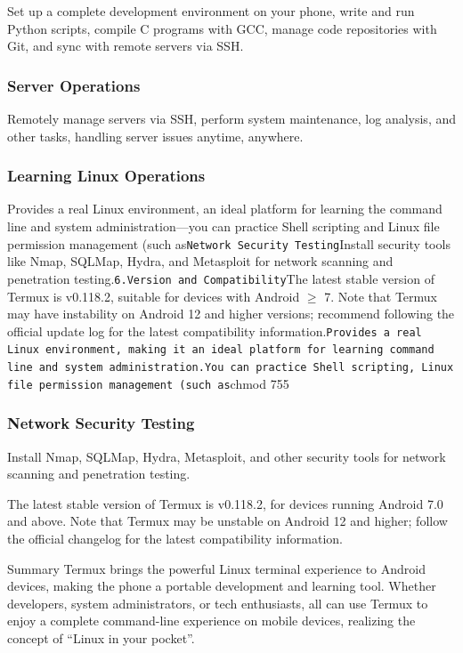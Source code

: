 Set up a complete development environment on your phone, write and run Python scripts, compile C programs with GCC, manage code repositories with Git, and sync with remote servers via SSH.

\subsubsection*{Server Operations}

Remotely manage servers via SSH, perform system maintenance, log analysis, and other tasks, handling server issues anytime, anywhere.

\subsubsection*{Learning Linux Operations}

Provides a real Linux environment, an ideal platform for learning the command line and system administration—you can practice Shell scripting and Linux file permission management (such as\texttt{Network Security Testing}Install security tools like Nmap, SQLMap, Hydra, and Metasploit for network scanning and penetration testing.\texttt{6.\allowbreak  Version and Compatibility}The latest stable version of Termux is v0.118.2, suitable for devices with Android $\geq$ 7. Note that Termux may have instability on Android 12 and higher versions; recommend following the official update log for the latest compatibility information.\texttt{Provides a real Linux environment, making it an ideal platform for learning command line and system administration.\allowbreak  You can practice Shell scripting, Linux file permission management (such as}chmod 755

\subsubsection*{Network Security Testing}

Install Nmap, SQLMap, Hydra, Metasploit, and other security tools for network scanning and penetration testing.


The latest stable version of Termux is v0.118.2, for devices running Android 7.0 and above. Note that Termux may be unstable on Android 12 and higher; follow the official changelog for the latest compatibility information.

\begin{tcbinfo}{Summary}
Termux brings the powerful Linux terminal experience to Android devices, making the phone a portable development and learning tool. Whether developers, system administrators, or tech enthusiasts, all can use Termux to enjoy a complete command-line experience on mobile devices, realizing the concept of “Linux in your pocket”.

\end{tcbinfo}


